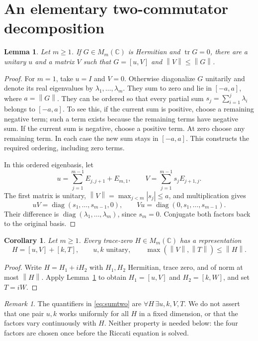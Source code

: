 \documentclass[11pt]{article}
\newtheorem{lemma}[theorem]{Lemma}
\newtheorem{corollary}[theorem]{Corollary}
\theoremstyle{remark}
\newtheorem{remark}[theorem]{Remark}
\newcommand{\C}{\mathbb C}
\newcommand{\tr}{\operatorname{tr}}
\newcommand{\diag}{\operatorname{diag}}
\newcommand{\norm}[1]{\left\lVert#1\right\rVert}
\newcommand{\comm}[2]{[#1,#2]}
\numberwithin{equation}{section}
\begin{document}
\section{An elementary two-commutator decomposition}\label{sec:sumtwo}
\begin{lemma}\label{lem:hermitian}
Let $m\ge1$. If $G\in M_m(\C)$ is Hermitian and $\tr G=0$, there are a unitary $u$ and a matrix
$V$ such that $G=\comm uV$ and $\norm V\le\norm G$.
\end{lemma}
\begin{proof}
For $m=1$, take $u=I$ and $V=0$. Otherwise diagonalize $G$ unitarily and denote
its real eigenvalues by $\lambda_1,\ldots,\lambda_m$. They sum to zero and lie in
$[-a,a]$, where $a=\norm G$. They can be ordered so that every partial sum
$s_j=\sum_{i=1}^j\lambda_i$ belongs to $[-a,a]$. To see this, if the current sum
is positive, choose a remaining negative term; such a term exists because the
remaining terms have negative sum. If the current sum is negative, choose a
positive term. At zero choose any remaining term. In each case the new sum
stays in $[-a,a]$. This constructs the required ordering, including zero terms.

In this ordered eigenbasis, let
\[
 u=\sum_{j=1}^{m-1}E_{j,j+1}+E_{m,1},\qquad
 V=\sum_{j=1}^{m-1}s_jE_{j+1,j}.
\]
The first matrix is unitary, $\norm V=\max_{j<m}|s_j|\le a$, and multiplication
gives
\[
 uV=\diag(s_1,\ldots,s_{m-1},0),\qquad
 Vu=\diag(0,s_1,\ldots,s_{m-1}).
\]
Their difference is $\diag(\lambda_1,\ldots,\lambda_m)$, since $s_m=0$.
Conjugate both factors back to the original basis.
\end{proof}

\begin{corollary}\label{cor:sumtwo}
Let $m\ge1$. Every trace-zero $H\in M_m(\C)$ has a representation
\begin{equation}\label{eq:sumtwo}
 H=\comm uV+\comm kT,\qquad
 u,k\text{ unitary},\qquad
 \max(\norm V,\norm T)\le\norm H.
\end{equation}
\end{corollary}
\begin{proof}
Write $H=H_1+iH_2$ with $H_1,H_2$ Hermitian, trace zero, and of norm at most
$\norm H$. Apply Lemma~\ref{lem:hermitian} to obtain
$H_1=\comm uV$ and $H_2=\comm kW$, and set $T=iW$.
\end{proof}

\begin{remark}
The quantifiers in \eqref{eq:sumtwo} are $\forall H\,\exists u,k,V,T$. We do not
assert that one pair $u,k$ works uniformly for all $H$ in a fixed dimension, or
that the factors vary continuously with $H$. Neither property is needed below:
the four factors are chosen once before the Riccati equation is solved.
\end{remark}
\end{document}
